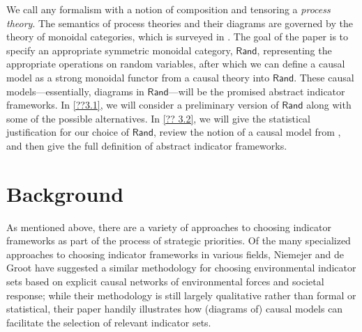 \documentclass{article}
\theoremstyle{definition}
\newcommand{\Cat}[1]{\mathsf{#1}}
\def\Ind{\Cat{Ind}}
\def\Rand{\Cat{Rand}}
\def\Stoch{\Cat{Stoch}}
\begin{document}
We call any formalism with a notion of composition and tensoring a \emph{process theory}. The semantics of process theories and their diagrams are governed by the theory of monoidal categories, which is surveyed in \cite{selinger09}. The goal of the paper is to specify an appropriate symmetric monoidal category, $\Rand$, representing the appropriate operations on random variables, after which we can define a causal model as a strong monoidal functor from a causal theory into $\Rand$. These causal models---essentially, diagrams in $\Rand$---will be the promised abstract indicator frameworks. In \ref{??3.1}, we will consider a preliminary version of $\Rand$ along with some of the possible alternatives. In \ref{?? 3.2}, we will give the statistical justification for our choice of $\Rand$, review the notion of a causal model from \cite{fong13}, and then give the full definition of abstract indicator frameworks.



\section{Background}
As mentioned above, there are a variety of approaches to choosing indicator frameworks as part of the process of strategic priorities. Of the many specialized approaches to choosing indicator frameworks in various fields, Niemejer and de Groot \cite{niemeijer08} have suggested a similar methodology for choosing environmental indicator sets based on explicit causal networks of environmental forces and societal response; while their methodology is still largely qualitative rather than formal or statistical, their paper handily illustrates how (diagrams of) causal models can facilitate the selection of relevant indicator sets. %
\end{document}
